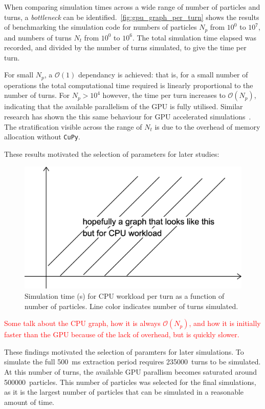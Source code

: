 \documentclass[11pt]{report}
\newcommand\todo[1]{\textcolor{red}{#1}}
\begin{document}
When comparing simulation times across a wide range of number of particles and turns, a \textit{bottleneck} can be identified.~\autoref{fig:gpu_graph_per_turn} shows the results of benchmarking the simulation code for numbers of particles $N_p$ from $10^0$ to $10^7$, and numbers of turns $N_t$ from $10^0$ to $10^6$. The total simulation time elapsed was recorded, and divided by the number of turns simulated, to give the time per turn. 

For small $N_p$, a $\mathcal{O}(1)$ dependancy is achieved: that is, for a small number of operations the total computational time required is linearly proportional to the number of turns. For $N_p>10^4$ however, the time per turn increases to $\mathcal{O}(N_p)$, indicating that the available parallelism of the GPU is fully utilised. 
Similar research has shown the this same behaviour for GPU accelerated simulations~\cite{Hegglin:2239398}. %
The stratification visible across the range of $N_t$ is due to the overhead of memory allocation without \verb|CuPy|. %

These results motivated the selection of parameters for later studies: 

\begin{figure}
  \centering
  \includegraphics*[width=0.7\linewidth]{CPU_graph_per_turn.png}
  \caption{Simulation time (s) for CPU workload per turn as a function of number of particles. Line color indicates number of turns simulated.}\label{fig:cpu_graph_per_turn}
\end{figure}

\todo{Some talk about the CPU graph, how it is always $\mathcal{O}(N_p)$, and how it is initially faster than the GPU because of the lack of overhead, but is quickly slower.}

These findings motivated the selection of paramters for later simulations. To simulate the full \qty{500}{\milli\second} extraction period requires \qty{235000}{turns} to be simulated. At this number of turns, the available GPU parallism becomes saturated around \qty{500000}{particles}. This number of particles was selected for the final simulations, as it is the largest number of particles that can be simulated in a reasonable amount of time.
\end{document}
